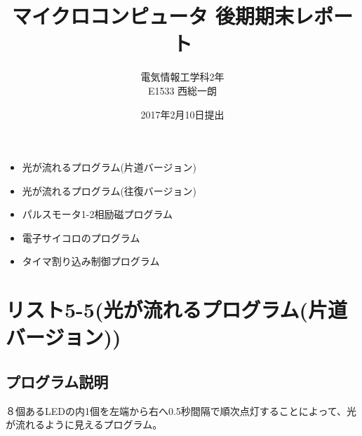 \documentclass[a4paper,12pt]{ujarticle}
\begin{document}
\title{マイクロコンピュータ 後期期末レポート}
\author{電気情報工学科2年 \\ E1533 西総一朗}
\date{2017年2月10日提出}
\maketitle
\begin{itemize}
 \item \large 光が流れるプログラム(片道バージョン)
 \item 光が流れるプログラム(往復バージョン)
 \item パルスモータ1-2相励磁プログラム
 \item 電子サイコロのプログラム
 \item タイマ割り込み制御プログラム
\end{itemize}
\clearpage
\tableofcontents
\clearpage
 \section{リスト5-5(光が流れるプログラム(片道バージョン))}
  \subsection{プログラム説明}
  ８個あるLEDの内1個を左端から右へ0.5秒間隔で順次点灯することによって、光が流れるように見えるプログラム。
\end{document}
